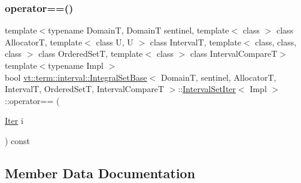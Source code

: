 \mbox{\label{structvt_1_1term_1_1interval_1_1_integral_set_base_1_1_interval_set_iter_a4981392cafb35bd47869470943de003c}} 
\subsubsection{\texorpdfstring{operator==()}{operator==()}}
{\footnotesize\ttfamily template$<$typename DomainT, DomainT sentinel, template$<$ class $>$ class AllocatorT, template$<$ class U, U $>$ class IntervalT, template$<$ class, class, class $>$ class Ordered\+SetT, template$<$ class $>$ class Interval\+CompareT$>$ \\
template$<$typename Impl $>$ \\
bool \hyperlink{structvt_1_1term_1_1interval_1_1_integral_set_base}{vt\+::term\+::interval\+::\+Integral\+Set\+Base}$<$ DomainT, sentinel, AllocatorT, IntervalT, Ordered\+SetT, Interval\+CompareT $>$\+::\hyperlink{structvt_1_1term_1_1interval_1_1_integral_set_base_1_1_interval_set_iter}{Interval\+Set\+Iter}$<$ Impl $>$\+::operator== (\begin{DoxyParamCaption}\item[{\hyperlink{structvt_1_1term_1_1interval_1_1_integral_set_base_1_1_interval_set_iter_a4056b2dcca9f60143d2d76387599e6e1}{Iter}}]{i }\end{DoxyParamCaption}) const\hspace{0.3cm}{\ttfamily [inline]}}



\subsection{Member Data Documentation}
\mbox{\label{structvt_1_1term_1_1interval_1_1_integral_set_base_1_1_interval_set_iter_a39af9348b844da48482e8d719b9d4c14}} 
